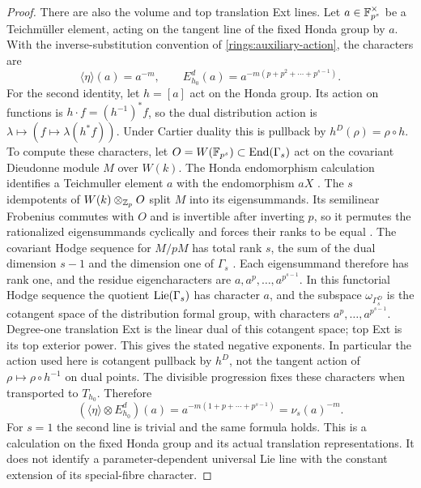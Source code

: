 \begin{proof}
There are also the volume and top translation Ext lines.
Let $a\in\mathbb F_{p^s}^\times$ be a Teichm\"uller element, acting on
the tangent line of the fixed Honda group by $a$.
With the inverse-substitution convention of
\eqref{rings:auxiliary-action}, the characters are
\[
 \langle\eta\rangle(a)=a^{-m},\qquad
 E_{h_0}^d(a)=a^{-m(p+p^2+\cdots+p^{s-1})}.
\]
For the second identity, let $h=[a]$ act on the Honda
group.  Its action on functions is
$h\cdot f=(h^{-1})^*f$, so the dual distribution action is
$\lambda\mapsto(f\mapsto\lambda(h^*f))$.
Under Cartier duality this is pullback by
$h^D(\rho)=\rho\circ h$.
To compute these characters, let
$O=W(\mathbb F_{p^s})\subset\operatorname{End}(\Gamma_s)$ act on the
covariant Dieudonne module $M$ over $W(k)$.  The Honda endomorphism
calculation identifies a Teichmuller element $a$ with the
endomorphism $aX$
\cite[Lemma~A2.2.16 and Theorem~A2.2.18]{RavenelGreenBook}.
The $s$ idempotents of $W(k)\otimes_{\mathbb Z_p}O$ split $M$ into its
eigensummands.  Its semilinear Frobenius commutes with $O$ and is
invertible after inverting $p$, so it permutes the rationalized
eigensummands cyclically and forces their ranks to be equal
\cite[Example~14 and Proposition~15]{ZinkDisplays}.
The covariant Hodge sequence for $M/pM$ has total rank $s$, the sum of the
dual dimension $s-1$ and the dimension one of $\Gamma_s$
\cite[Section~5]{Lau2010Tate}.  Each eigensummand therefore has
rank one, and the residue eigencharacters are
$a,a^p,\ldots,a^{p^{s-1}}$.
In this functorial Hodge sequence the quotient
$\operatorname{Lie}(\Gamma_s)$ has character $a$, and the subspace
$\omega_{\Gamma_s^D}$ is the cotangent space of the
distribution formal group, with characters
$a^p,\ldots,a^{p^{s-1}}$.
Degree-one translation Ext is the linear dual of this cotangent
space; top Ext is its top exterior power.  This gives the stated
negative exponents.
In particular the action used here is cotangent
pullback by $h^D$, not the tangent action of
$\rho\mapsto\rho\circ h^{-1}$ on dual points.
The divisible progression fixes these
characters when transported to $T_{h_0}$.
Therefore
\begin{equation}
\label{full:connected-top-character}
 (\langle\eta\rangle\otimes E_{h_0}^d)(a)
   =a^{-m(1+p+\cdots+p^{s-1})}
   =\nu_s(a)^{-m}.
\end{equation}
For $s=1$ the second line is trivial and the same formula holds.
This is a calculation on the fixed Honda group and its actual
translation representations.  It does not identify a
parameter-dependent universal Lie line with the constant
extension of its special-fibre character.


\end{proof}
